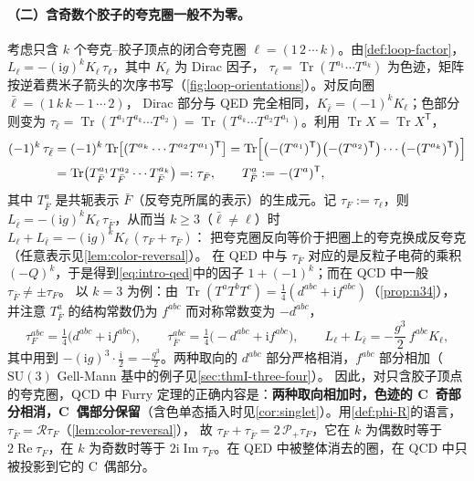 \documentclass[UTF8,a4paper,11pt,fontset=fandol]{ctexart}
\theoremstyle{cplain}
\theoremstyle{cdefinition}
\theoremstyle{cremark}
\numberwithin{equation}{section}
\DeclareMathOperator{\Tr}{Tr}
\DeclareMathOperator{\Real}{Re}
\DeclareMathOperator{\Imag}{Im}
\newcommand{\tp}{\mathsf{T}}                         %
\newcommand{\Rop}{\mathcal{R}}                       %
\newcommand{\Pp}{\mathcal{P}_{+}}                    %
\newcommand{\ii}{\mathrm{i}}                        %
\begin{document}
\paragraph{（二）含奇数个胶子的夸克圈一般不为零。}
考虑只含 $k$ 个夸克--胶子顶点的闭合夸克圈 $\ell=(1\,2\,\cdots\,k)$。由\cref{def:loop-factor}，$L_\ell=-(\ii g)^kK_\ell\,\tau_\ell$，其中 $K_\ell$ 为 Dirac 因子，
$\tau_\ell=\Tr(T^{a_1}\cdots T^{a_k})$ 为色迹，矩阵按逆着费米子箭头的次序书写（\cref{fig:loop-orientations}）。对反向圈 $\bar\ell=(1\,k\,k{-}1\,\cdots\,2)$，
Dirac 部分与 QED 完全相同，$K_{\bar\ell}=(-1)^kK_\ell$；色部分则变为 $\tau_{\bar\ell}=\Tr(T^{a_1}T^{a_k}\cdots T^{a_2})=\Tr(T^{a_k}\cdots T^{a_2}T^{a_1})$。利用 $\Tr X=\Tr X^{\tp}$，
\begin{equation}\label{eq:intro-antiquark}
\begin{aligned}
(-1)^k\,\tau_{\bar\ell}
&=(-1)^k\Tr\bigl[(T^{a_k}\cdots T^{a_2}T^{a_1})^{\tp}\bigr]
=\Tr\Bigl[\bigl(-(T^{a_1})^{\tp}\bigr)\bigl(-(T^{a_2})^{\tp}\bigr)\cdots\bigl(-(T^{a_k})^{\tp}\bigr)\Bigr]\\
&=\Tr\bigl(T_{\bar F}^{a_1}T_{\bar F}^{a_2}\cdots T_{\bar F}^{a_k}\bigr)=:\tau_{\bar F},
\qquad T^a_{\bar F}:=-(T^a)^{\tp},
\end{aligned}
\end{equation}
其中 $T^a_{\bar F}$ 是共轭表示 $\bar F$（反夸克所属的表示）的生成元。记 $\tau_F:=\tau_\ell$，则 $L_{\bar\ell}=-(\ii g)^kK_\ell\,\tau_{\bar F}$，从而当 $k\ge3$（$\bar\ell\neq\ell$）时 $L_\ell+L_{\bar\ell}=-(\ii g)^kK_\ell\,(\tau_F+\tau_{\bar F})$：
把夸克圈反向等价于把圈上的夸克换成反夸克\cite{MooreGorda2023}（任意表示见\cref{lem:color-reversal}）。
在 QED 中与 $\tau_{\bar F}$ 对应的是反粒子电荷的乘积 $(-Q)^k$，于是得到\cref{eq:intro-qed}中的因子 $1+(-1)^k$；而在 QCD 中一般 $\tau_{\bar F}\neq\pm\tau_F$。
以 $k=3$ 为例：由 $\Tr(T^aT^bT^c)=\frac14(d^{abc}+\ii f^{abc})$（\cref{prop:n34}），并注意 $T^a_{\bar F}$ 的结构常数仍为 $f^{abc}$ 而对称常数变为 $-d^{abc}$，
\begin{equation}\label{eq:intro-k3}
\tau_F^{abc}=\tfrac14\bigl(d^{abc}+\ii f^{abc}\bigr),\qquad
\tau_{\bar F}^{abc}=\tfrac14\bigl(-d^{abc}+\ii f^{abc}\bigr),\qquad
L_\ell+L_{\bar\ell}=-\frac{g^3}{2}\,f^{abc}K_\ell ,
\end{equation}
其中用到 $-(\ii g)^3\cdot\frac{\ii}{2}=-\frac{g^3}{2}$。两种取向的 $d^{abc}$ 部分严格相消，$f^{abc}$ 部分相加（$\mathrm{SU}(3)$ Gell-Mann 基中的例子见\cref{sec:thmI-three-four}）。
因此，对只含胶子顶点的夸克圈，QCD 中 Furry 定理的正确内容是：\textbf{两种取向相加时，色迹的 C~奇部分相消，C~偶部分保留}（含色单态插入时见\cref{cor:singlet}）。用\cref{def:phi-R}的语言，$\tau_{\bar F}=\Rop\tau_F$（\cref{lem:color-reversal}），
故 $\tau_F+\tau_{\bar F}=2\,\Pp\tau_F$，它在 $k$ 为偶数时等于 $2\Real\tau_F$，在 $k$ 为奇数时等于 $2\ii\Imag\tau_F$。在 QED 中被整体消去的圈，在 QCD 中只被投影到它的 C~偶部分。
\end{document}
